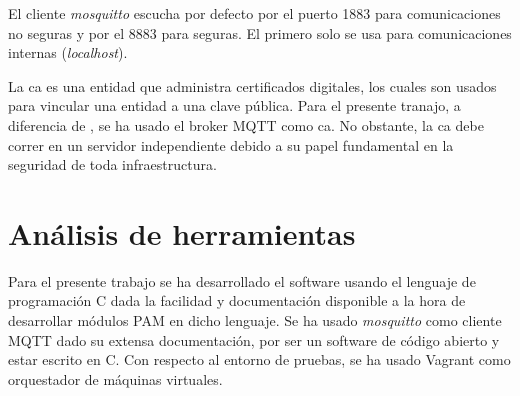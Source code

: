 El cliente \textit{mosquitto} escucha por defecto por el puerto 1883 para comunicaciones no seguras
y por el 8883 para seguras. El primero solo se usa para comunicaciones internas (\textit{localhost}).

La \acrshort{ca} es una entidad que administra certificados digitales, los cuales son usados para vincular una entidad a una 
clave pública. Para el presente tranajo, a diferencia de \cite{multipauthpaper}, se ha usado el broker MQTT como \acrshort{ca}. 
No obstante, la \acrshort{ca} debe correr en un servidor independiente debido a su papel fundamental en la seguridad de toda
infraestructura.


\section{Análisis de herramientas}

Para el presente trabajo se ha desarrollado el software usando el lenguaje de programación C dada la facilidad y documentación
disponible a la hora de desarrollar módulos PAM en dicho lenguaje. 
Se ha usado \textit{mosquitto} \cite{eclipse_2018} como cliente MQTT dado su extensa documentación, por ser un software de código 
abierto y estar escrito en C.
Con respecto al entorno de pruebas, se ha usado Vagrant \cite{vagrant} como orquestador de máquinas virtuales.
